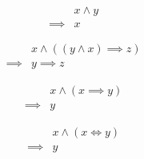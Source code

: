 \begin{prop}
\label{Proposition:land_omit}
\begin{align*}
& x \land y \\
\implies & x
\end{align*}
\end{prop}

\begin{prop}
\label{Proposition:lemma_uniqueness}
\begin{align*}
& x \land ((y \land x) \implies z) \\
\implies & y \implies z
\end{align*}
\end{prop}

\begin{prop}
\label{Proposition:implies_satisfy}
\begin{align*}
& x \land (x \implies y) \\
\implies & y
\end{align*}
\end{prop}

\begin{prop}
\label{Proposition:iff_satisfy}
\begin{align*}
& x \land (x \iff y) \\
\implies & y
\end{align*}
\end{prop}

